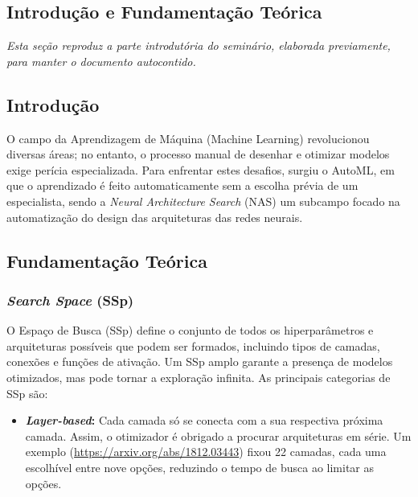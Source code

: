 \documentclass[a4paper,12pt]{article}
\begin{document}
\newpage
\begin{appendices}

\section{Introdução e Fundamentação Teórica}
\label{app:intro}

\textit{Esta seção reproduz a parte introdutória do seminário, elaborada previamente, para manter o documento autocontido.}

\bigskip

\subsection*{Introdução}
O campo da Aprendizagem de Máquina (Machine Learning) revolucionou diversas áreas; no entanto, o processo manual de desenhar e otimizar modelos exige perícia especializada. Para enfrentar estes desafios, surgiu o AutoML, em que o aprendizado é feito automaticamente sem a escolha prévia de um especialista, sendo a \textit{Neural Architecture Search} (NAS) um subcampo focado na automatização do design das arquiteturas das redes neurais.

\subsection*{Fundamentação Teórica}

\subsubsection*{\textit{Search Space} (SSp)}
O Espaço de Busca (SSp) define o conjunto de todos os hiperparâmetros e arquiteturas possíveis que podem ser formados, incluindo tipos de camadas, conexões e funções de ativação. Um SSp amplo garante a presença de modelos otimizados, mas pode tornar a exploração infinita. As principais categorias de SSp são:
\begin{itemize}[noitemsep]
    \item \textbf{\textit{Layer-based}:} Cada camada só se conecta com a sua respectiva próxima camada. Assim, o otimizador é obrigado a procurar arquiteturas em série. Um exemplo (\url{https://arxiv.org/abs/1812.03443}) fixou 22 camadas, cada uma escolhível entre nove opções, reduzindo o tempo de busca ao limitar as opções.


\end{itemize}
\end{appendices}
\end{document}
